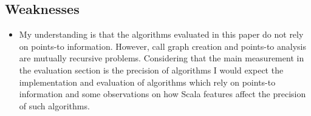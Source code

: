 \documentclass{article} \usepackage{hyperref} \usepackage{graphicx}
\begin{document}
\subsection{Weaknesses}
\begin{itemize}
\item My understanding is that the algorithms evaluated in this paper
  do not rely on points-to information. However, call graph creation
  and points-to analysis are mutually recursive problems. Considering
  that the main measurement in the evaluation section is the precision
  of algorithms I would expect the implementation and evaluation of
  algorithms which rely on points-to information and some observations
  on how Scala features affect the precision of such algorithms.
\end{itemize}
\end{document}
